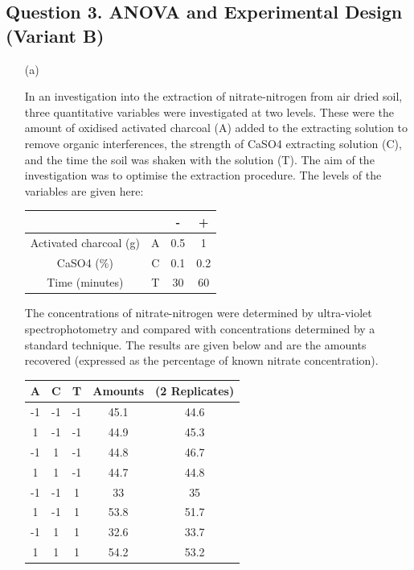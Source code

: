 \documentclass[a4paper,12pt]{article}
\begin{document}
\newpage	
\subsection*{Question 3. ANOVA and Experimental Design (Variant B) }
\begin{itemize} %
	\item[(a)] %
	
	In an investigation into the extraction of nitrate-nitrogen from air dried soil, three quantitative variables were investigated at two levels. These were the amount of oxidised activated charcoal (A) added to the extracting solution to remove organic interferences, the strength of CaSO4 extracting solution (C), and the time the soil was shaken with the solution (T). The aim of the investigation was to optimise the extraction procedure. The levels of the variables are given here:
	\begin{center}
		{
			\large
			\begin{tabular}{|cc|c|c|}
				\hline	&		&\phantom{sp}	{\LARGE -}\phantom{sp}	&	\phantom{sp} {\LARGE +} \phantom{sp}	\\ \hline
				Activated charcoal (g) 	&	A 	&	0.5	&	1	\\ \hline
				CaSO{4} (\%) 	&	C 	&	0.1	&	0.2	\\ \hline
				Time (minutes) 	&	T 	&	30	&	60	\\ \hline
			\end{tabular} 
		}
	\end{center}
	
	The concentrations of nitrate-nitrogen were determined by ultra-violet spectrophotometry and compared with concentrations determined by a standard technique. The results are given below and are the amounts recovered (expressed as the percentage of known nitrate concentration).
	{
		\large
		\begin{center}
			\begin{tabular}{|c|c|c|cc|}
				\hline
				\phantom{sp}A\phantom{sp}	&	\phantom{sp}C\phantom{sp}	&\phantom{sp}	T\phantom{sp}	&	Amounts&	(2 Replicates)	\\
				\hline
				-1	&	-1	&	-1	&	45.1	&	44.6	\\ \hline
				
				1	&	-1	&	-1	&	44.9	&	45.3	\\ \hline
				
				-1	&	1	&	-1	&	44.8	&	46.7	\\ \hline
				
				1	&	1	&	-1	&	44.7	&	44.8	\\ \hline
				
				-1	&	-1	&	1	&	33	&	35	\\ \hline
				
				1	&	-1	&	1	&	53.8	&	51.7	\\ \hline
				
				-1	&	1	&	1	&	32.6	&	33.7	\\ \hline							
				1	&	1	&	1	&	54.2	&	53.2	\\ \hline
			\end{tabular}
		\end{center}
	}
\end{itemize}
\end{document}
